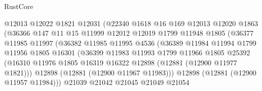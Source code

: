 \begin{lexlean}{RustCore}
\begin{coremodule}
                              @12013
                              @12022
                              @1821
                              @12031
                              (@22340
                                @1618
                                @16
                                @169
                                @12013
                                @12020
                                @1863
                                (@36366
                                  @147
                                  @11
                                  @15
                                  @11999
                                  @12012
                                  @12019
                                  @1799
                                  @11948
                                  @1805
                                  (@36377
                                    @11985
                                    @11997
                                    (@36382
                                      @11985
                                      @11995
                                      @4536
                                      (@36389
                                        @11984
                                        @11994
                                        @1799
                                        @11956
                                        @1805
                                        @16301
                                        (@36399
                                          @11983
                                          @11993
                                          @1799
                                          @11966
                                          @1805
                                          @25392
                                          (@16310
                                            @11976
                                            @1805
                                            @16319
                                            @16322
                                            @12898
                                            (@12881 (@12900 @11977 @1821)))
                                          @12898
                                          (@12881 (@12900 @11967 @11983)))
                                        @12898
                                        (@12881 (@12900 @11957 @11984)))
                                      @21039
                                      @21042
                                      @21045
                                      @21049
                                      @21054

\end{coremodule}
\end{lexlean}
